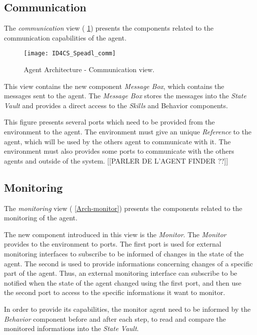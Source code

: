 \subsection{Communication}

The \emph{communication} view (\figurename{} \ref{Arch-comm}) presents the components related to the communication capabilities of the agent. 

\begin{figure}
\centering
\texttt{[image: ID4CS\_Speadl\_comm]}
\caption{Agent Architecture - Communication view.}
\label{Arch-comm}
\end{figure}

This view contains the new component \emph{Message Box}, which contains the messages sent to the agent. The \emph{Message Box} stores the messages into the \emph{State Vault} and provides a direct access to the \emph{Skills} and {Behavior} components.

This figure presents several ports which need to be provided from the environment to the agent. The environment must give an unique \emph{Reference} to the agent, which will be used by the others agent to communicate with it. The environment must also provides some ports to communicate with the others agents and outside of the system.
[[PARLER DE L'AGENT FINDER ??]]

\subsection{Monitoring}

The \emph{monitoring} view (\figurename{} \ref{Arch-monitor}) presents the components related to the monitoring of the agent. 

The new component introduced in this view is the \emph{Monitor}. The \emph{Monitor} provides to the environment to ports. The first port is used for external monitoring interfaces to subscribe to be informed of changes in the state of the agent. The second is used to provide informations concerning changes of a specific part of the agent. Thus, an external monitoring interface can subscribe to be notified when the state of the agent changed using the first port, and then use the second port to access to the specific informations it want to monitor.

In order to provide its capabilities, the monitor agent need to be informed by the \emph{Behavior} component before and after each step, to read and compare the monitored informations into the \emph{State Vault}.

